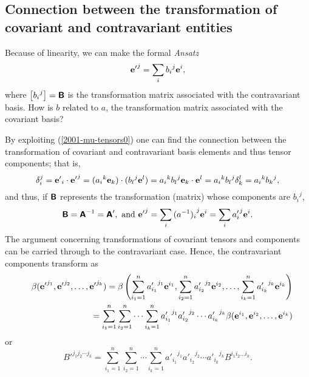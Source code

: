 \subsection{Connection between the transformation of covariant and contravariant entities}

Because of linearity, we can make the formal {\it Ansatz}
\begin{equation}
{{\bf e}'}^j=\sum_i{b_i}^j{\bf e}^i,
\end{equation}
where $\left[{b_i}^j\right] = \textsf{\textbf{B}}$ is
the transformation matrix associated with the contravariant basis.
How is $b$ related to $a$,
the transformation matrix associated with the covariant basis?

By exploiting (\ref{2001-mu-tensors0}) one can find the connection between
the transformation of covariant and contravariant basis elements and thus
tensor components; that is,
\begin{equation}
\delta_i^j= {{\bf e}'}_i\cdot {{\bf e}'}^j=({a_i}^k{\bf e}_k)\cdot ({b_l}^j{\bf e}^l)={a_i}^k {b_l}^j {\bf e}_k\cdot {\bf e}^l={a_i}^k{b_l}^j \delta_k^l
={a_i}^k {b_k}^j,
\end{equation}
and thus, if $\textsf{\textbf{B}}$ represents the transformation (matrix) whose components are ${b_i}^j$,
\begin{equation}
\textsf{\textbf{B}}=\textsf{\textbf{A}}^{-1} =\textsf{\textbf{A}}',\textrm{ and } {{\bf e}'}^j=\sum_i{(a^{-1})_i}^j{\bf e}^i=\sum_i{ a'_i}^j{\bf e}^i.
\label{2012-m-ch-tensor-tocontrav}
\end{equation}
The argument concerning transformations of covariant tensors and components
can be carried through to the contravariant case.
Hence, the contravariant components transform as
\begin{eqnarray}
&&\beta ( {{\bf e}'}^{j_1},{{\bf e}'}^{j_2},\ldots ,{{\bf e}'}^{j_k})=
\beta \left(
\sum_{i_1=1}^n {a'_{i_1}}^{j_1} {\bf e}^{i_1},
\sum_{i_2=1}^n {a'_{i_2}}^{j_2} {\bf e}^{i_2},
\ldots ,
\sum_{i_k=1}^n {a'_{i_k}}^{j_k} {\bf e}^{i_k}
\right)
\nonumber \\&& \quad
=
\sum_{i_1=1}^n\sum_{i_2=1}^n\cdots \sum_{i_k=1}^n
{a'_{i_1}}^{j_1}{a'_{i_2}}^{j_2}\cdots {a'_{i_k}}^{j_k} \beta ( {\bf e}^{i_1},{\bf e}^{i_2},\ldots ,{\bf e}^{i_k})
 \label{2012-m-ch-tensor-etotccon1}
\end{eqnarray}
or
\begin{equation}
B'^{{j_1}{j_2}\cdots {j_k}}=
\sum_{i_1=1}^n\sum_{i_2=1}^n\cdots \sum_{i_k=1}^n
{a'_{i_1}}^{j_1}{a'_{i_2}}^{j_2}\cdots {a'_{i_k}}^{j_k} B^{i_1 i_2\ldots i_k}.
 \label{2012-m-ch-tensor-etotccon2}
\end{equation}


